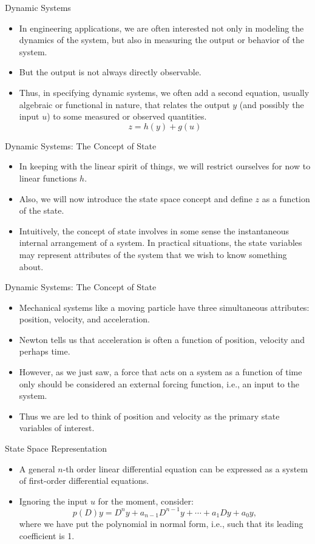 \begin{frame}
Dynamic Systems
 \begin{itemize}
 \item In engineering applications, we are often interested not
 only in modeling the dynamics of the system, but also in
 measuring the output or behavior of the system.
 \item But the output is not always directly observable.
 \item Thus, in specifying dynamic systems, we often add a second
 equation, usually algebraic or functional in nature, that relates
 the output $y$ (and possibly the input $u$) to some measured or observed quantities.
  \[z = h(y)+g(u)\]
\end{itemize}
\end{frame}
\begin{frame}
Dynamic Systems: The Concept of State
 \begin{itemize}
 \item In keeping with the linear spirit of things, we will
 restrict ourselves for now to linear functions $h$.
 \item Also, we will now introduce the state space concept and
 define $z$ as a function of the state.
 \item Intuitively, the concept of state involves in some sense the
 instantaneous internal arrangement of a system.  In practical
 situations, the state variables may represent attributes of the
 system that we wish to know something about.
\end{itemize}
\end{frame}
\begin{frame}
Dynamic Systems: The Concept of State
 \begin{itemize}
 \item Mechanical systems like a moving particle have three simultaneous attributes:  position, velocity, and
 acceleration.
 \item Newton tells us that acceleration is often a function
 of position, velocity and perhaps time.
 \item However, as we just saw, a force that acts on a system as a function of
 time only should be considered an external forcing function,
 i.e., an input to the system.
\item Thus we are led to think of position and velocity as the
primary state variables of interest.
\end{itemize}
\end{frame}
\begin{frame}
State Space Representation
 \begin{itemize}
 \item A general $n$-th order linear differential equation can be
 expressed as a system of first-order differential equations.
 \item Ignoring the input $u$ for the moment, consider:
 \[p(D)y = D^ny+a_{n-1}D^{n-1}y+\cdots +a_1Dy+a_0y,\]
 where we have put the polynomial in normal form, i.e., such that
 its leading coefficient is 1.
\end{itemize}
\end{frame}
